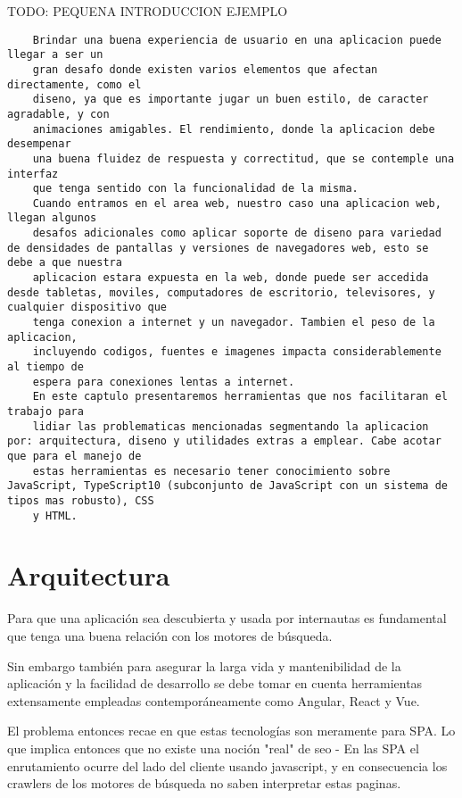 TODO: PEQUENA INTRODUCCION EJEMPLO

\begin{lstlisting}
    Brindar una buena experiencia de usuario en una aplicacion puede llegar a ser un
    gran desafo donde existen varios elementos que afectan directamente, como el
    diseno, ya que es importante jugar un buen estilo, de caracter agradable, y con
    animaciones amigables. El rendimiento, donde la aplicacion debe desempenar
    una buena fluidez de respuesta y correctitud, que se contemple una interfaz
    que tenga sentido con la funcionalidad de la misma.
    Cuando entramos en el area web, nuestro caso una aplicacion web, llegan algunos
    desafos adicionales como aplicar soporte de diseno para variedad de densidades de pantallas y versiones de navegadores web, esto se debe a que nuestra
    aplicacion estara expuesta en la web, donde puede ser accedida desde tabletas, moviles, computadores de escritorio, televisores, y cualquier dispositivo que
    tenga conexion a internet y un navegador. Tambien el peso de la aplicacion,
    incluyendo codigos, fuentes e imagenes impacta considerablemente al tiempo de
    espera para conexiones lentas a internet.
    En este captulo presentaremos herramientas que nos facilitaran el trabajo para
    lidiar las problematicas mencionadas segmentando la aplicacion por: arquitectura, diseno y utilidades extras a emplear. Cabe acotar que para el manejo de
    estas herramientas es necesario tener conocimiento sobre JavaScript, TypeScript10 (subconjunto de JavaScript con un sistema de tipos mas robusto), CSS
    y HTML.
\end{lstlisting}

\section{Arquitectura}

Para que una aplicación sea descubierta y usada por internautas es fundamental que tenga una buena relación con los motores de búsqueda.

Sin embargo también para asegurar la larga vida y mantenibilidad de la aplicación y la facilidad de desarrollo se debe tomar en cuenta herramientas extensamente empleadas contemporáneamente como Angular, React y Vue.

El problema entonces recae en que estas tecnologías son meramente para SPA. Lo que implica entonces que no existe una noción "real" de seo - En las SPA el enrutamiento ocurre del lado del cliente usando javascript, y en consecuencia los crawlers de los motores de búsqueda no saben interpretar estas paginas.

